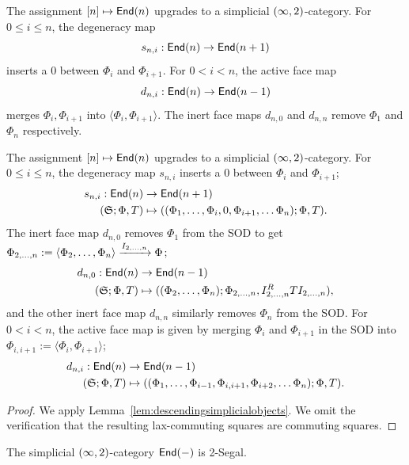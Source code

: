 \begin{cor}\label{prop:simplicialend}
    The assignment $[n]\mapsto\mathsf{End}(n)$ upgrades to a simplicial $(\infty,2)$-category. For $0\leq i\leq n$, the degeneracy map
    \[s_{n,i}:\mathsf{End}(n)\to \mathsf{End}(n+1)\]
    inserts a $0$ between $\Phi_i$ and $\Phi_{i+1}$. For $0< i< n$, the active face map
    \[d_{n,i}:\mathsf{End}(n)\to \mathsf{End}(n-1)\]
    merges $\Phi_i,\Phi_{i+1}$ into $\langle\Phi_i,\Phi_{i+1}\rangle$. The inert face maps $d_{n,0}$ and $d_{n,n}$ remove $\Phi_1$ and $\Phi_n$ respectively. 

    The assignment $[n]\mapsto \mathsf{End}(n)$ upgrades to a simplicial $(\infty,2)$-category. For $0\leq i\leq n$, the degeneracy map $s_{n,i}$ inserts a $0$ between $\Phi_i$ and $\Phi_{i+1}$;
    \begin{align*}
        s_{n,i}:\mathsf{End}(n)&\to\mathsf{End}(n+1)\\
        (\mathfrak{S};\Phi,T)&\mapsto ((\Phi_1,\dots,\Phi_i,0,\Phi_{i+1},\dots\Phi_n);\Phi,T).
    \end{align*}
    The inert face map $d_{n,0}$ removes $\Phi_1$ from the SOD to get $\Phi_{2,\dots,n} := \langle\Phi_2,\dots,\Phi_n\rangle\xrightarrow{I_{2,\dots,n}}\Phi$;
    \begin{align*}
        d_{n,0}:\mathsf{End}(n)&\to\mathsf{End}(n-1)\\
        (\mathfrak{S};\Phi,T)&\mapsto ((\Phi_2,\dots,\Phi_n);\Phi_{2,\dots,n},I_{2,\dots,n}^RTI_{2,\dots,n}),
    \end{align*}
    and the other inert face map $d_{n,n}$ similarly removes $\Phi_n$ from the SOD. For $0<i<n$, the active face map is given by merging $\Phi_{i}$ and $\Phi_{i+1}$ in the SOD into $\Phi_{i,i+1} := \langle\Phi_i,\Phi_{i+1}\rangle$;
    \begin{align*}
        d_{n,i}:\mathsf{End}(n)&\to\mathsf{End}(n-1)\\
        (\mathfrak{S};\Phi,T)&\mapsto ((\Phi_1,\dots,\Phi_{i-1},\Phi_{i,i+1},\Phi_{i+2},\dots\Phi_n);\Phi,T).
    \end{align*}
\end{cor}

\begin{proof}
    We apply Lemma~\ref{lem:descendingsimplicialobjects}. We omit the verification that the resulting lax-commuting squares are commuting squares.
\end{proof}

\begin{prop}
    The simplicial $(\infty,2)$-category $\mathsf{End}(-)$ is 2-Segal.
\end{prop}

